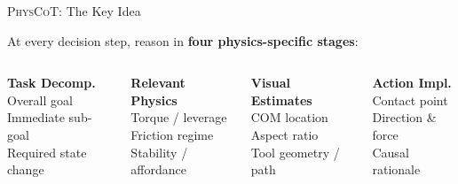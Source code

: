 \documentclass[aspectratio=169,10pt]{beamer}
\newcommand{\physcot}{\textsc{PhysCoT}}
\begin{document}
\begin{frame}{\physcot{}: The Key Idea}
\begin{center}
\large
At every decision step, reason in \textbf{four physics-specific stages}:
\end{center}

\vspace{0.3cm}
\begin{columns}[T]
\begin{tcolorbox}[colback=stepA!12,colframe=stepA,title={\small Step A},
                  left=3pt,right=3pt,top=2pt,bottom=2pt,boxrule=1.2pt]
\small\textbf{Task Decomp.}\\[3pt]
Overall goal\\
Immediate sub-goal\\
Required state change
\end{tcolorbox}

\begin{tcolorbox}[colback=stepB!12,colframe=stepB,title={\small Step B},
                  left=3pt,right=3pt,top=2pt,bottom=2pt,boxrule=1.2pt]
\small\textbf{Relevant Physics}\\[3pt]
Torque / leverage\\
Friction regime\\
Stability / affordance
\end{tcolorbox}

\begin{tcolorbox}[colback=stepC!12,colframe=stepC,title={\small Step C},
                  left=3pt,right=3pt,top=2pt,bottom=2pt,boxrule=1.2pt]
\small\textbf{Visual Estimates}\\[3pt]
COM location\\
Aspect ratio\\
Tool geometry / path
\end{tcolorbox}

\begin{tcolorbox}[colback=stepD!12,colframe=stepD,title={\small Step D},
                  left=3pt,right=3pt,top=2pt,bottom=2pt,boxrule=1.2pt]
\small\textbf{Action Impl.}\\[3pt]
Contact point\\
Direction \& force\\
Causal rationale
\end{tcolorbox}
\end{columns}


\end{frame}
\end{document}
